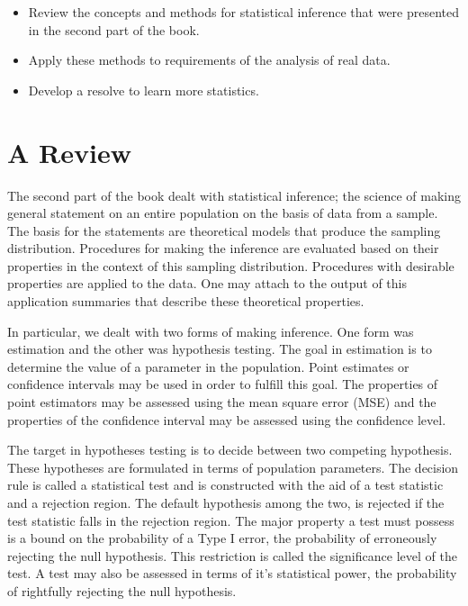 \documentclass[]{krantz}
\theoremstyle{definition}
\theoremstyle{definition}
\theoremstyle{definition}
\theoremstyle{remark}
\begin{document}
\begin{itemize}
\item
  Review the concepts and methods for statistical inference that were
  presented in the second part of the book.
\item
  Apply these methods to requirements of the analysis of real data.
\item
  Develop a resolve to learn more statistics.
\end{itemize}

\hypertarget{a-review}{%
\section{A Review}\label{a-review}}

The second part of the book dealt with statistical inference; the
science of making general statement on an entire population on the basis
of data from a sample. The basis for the statements are theoretical
models that produce the sampling distribution. Procedures for making the
inference are evaluated based on their properties in the context of this
sampling distribution. Procedures with desirable properties are applied
to the data. One may attach to the output of this application summaries
that describe these theoretical properties.

In particular, we dealt with two forms of making inference. One form was
estimation and the other was hypothesis testing. The goal in estimation
is to determine the value of a parameter in the population. Point
estimates or confidence intervals may be used in order to fulfill this
goal. The properties of point estimators may be assessed using the mean
square error (MSE) and the properties of the confidence interval may be
assessed using the confidence level.

The target in hypotheses testing is to decide between two competing
hypothesis. These hypotheses are formulated in terms of population
parameters. The decision rule is called a statistical test and is
constructed with the aid of a test statistic and a rejection region. The
default hypothesis among the two, is rejected if the test statistic
falls in the rejection region. The major property a test must possess is
a bound on the probability of a Type I error, the probability of
erroneously rejecting the null hypothesis. This restriction is called
the significance level of the test. A test may also be assessed in terms
of it's statistical power, the probability of rightfully rejecting the
null hypothesis.
\end{document}
